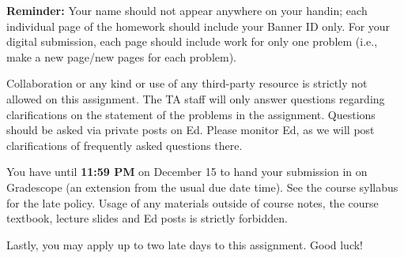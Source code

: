 \documentclass{common/cs157}
\begin{document}
\textbf{Reminder:} Your name should not appear anywhere on your handin; each individual page of the homework should include your Banner ID only. For your digital submission, each page should include work for only one problem (i.e., make a new page/new pages for each problem).

Collaboration or any kind or use of any third-party resource is strictly not allowed on this assignment. The TA staff will only answer questions regarding clarifications on the statement of the problems in the assignment. Questions should be asked via private posts on Ed. Please monitor Ed, as we will post clarifications of frequently asked questions there.

You have until \textbf{11:59 PM} on December 15 to hand your submission in on Gradescope (an extension from the usual due date time). See the course syllabus for the late policy. Usage of any materials outside of course notes, the course textbook, lecture slides and Ed posts is strictly forbidden.

Lastly, you may apply up to two late days to this assignment. Good luck!
\end{document}
